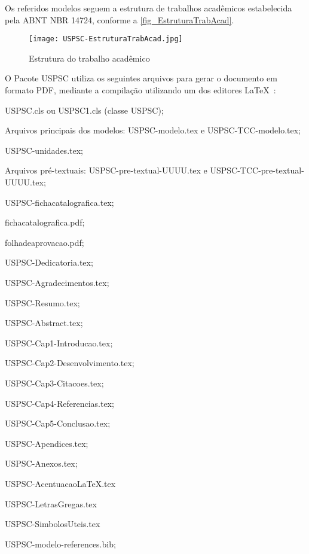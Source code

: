 Os referidos modelos seguem a estrutura de trabalhos acadêmicos estabelecida pela ABNT NBR 14724, conforme a \autoref{fig_EstruturaTrabAcad}. 

\newpage
\begin{figure}[htb]
	\caption{\label{fig_EstruturaTrabAcad}Estrutura do trabalho acadêmico}
	\begin{center}
		\texttt{[image: USPSC-EstruturaTrabAcad.jpg]}
	\end{center}
\end{figure}
		
O Pacote USPSC utiliza os seguintes arquivos para gerar o documento em formato PDF, mediante a compilação utilizando um dos editores \LaTeX\ :

\begin{alineas}	 
	\item USPSC.cls ou USPSC1.cls (classe USPSC); 
	\item Arquivos principais dos modelos: USPSC-modelo.tex  e  USPSC-TCC-modelo.tex;
	\item USPSC-unidades.tex;
	\item Arquivos pré-textuais: USPSC-pre-textual-UUUU.tex e USPSC-TCC-pre-textual-UUUU.tex;
	\item USPSC-fichacatalografica.tex;
	\item fichacatalografica.pdf;
	\item folhadeaprovacao.pdf;
	\item USPSC-Dedicatoria.tex;
	\item USPSC-Agradecimentos.tex;
	\item USPSC-Resumo.tex;
	\item USPSC-Abstract.tex;
	\item USPSC-Cap1-Introducao.tex;
	\item USPSC-Cap2-Desenvolvimento.tex;
	\item USPSC-Cap3-Citacoes.tex;
	\item USPSC-Cap4-Referencias.tex;
	\item USPSC-Cap5-Conclusao.tex;
	\item USPSC-Apendices.tex;
	\item USPSC-Anexos.tex;
	\item USPSC-AcentuacaoLaTeX.tex
	\item USPSC-LetrasGregas.tex
	\item USPSC-SimbolosUteis.tex
	\item USPSC-modelo-references.bib;
	
\end{alineas}	 

